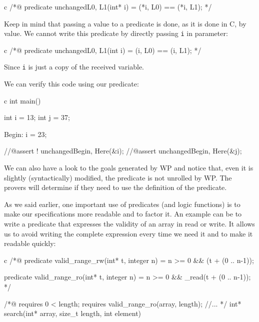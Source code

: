 \documentclass[middle]{zmdocument}
\begin{document}
\begin{CodeBlock}{c}
/*@
  predicate unchanged{L0, L1}(int* i) =
    \at(*i, L0) == \at(*i, L1);
*/
\end{CodeBlock}



\begin{Warning}
  Keep in mind that passing a value to a predicate is done, as it is done in C,
  by value. We cannot write this predicate by directly passing \texttt{i} in
  parameter:

\begin{CodeBlock}{c}
/*@
  predicate unchanged{L0, L1}(int i) =
    \at(i, L0) == \at(i, L1);
 */
\end{CodeBlock}

  Since \texttt{i} is just a copy of the received variable.
\end{Warning}


We can verify this code using our predicate:



\begin{CodeBlock}{c}
int main(){
  int i = 13;
  int j = 37;

 Begin:
  i = 23;
 
  //@assert ! unchanged{Begin, Here}(&i);
  //@assert   unchanged{Begin, Here}(&j);
}
\end{CodeBlock}



We can also have a look to the goals generated by WP and notice that,
even it is slightly (syntactically) modified, the predicate is not
unrolled by WP. The provers will determine if they need to use the
definition of the predicate.

As we said earlier, one important use of predicates (and logic
functions) is to make our specifications more readable and to factor it.
An example can be to write a predicate that expresses the validity of an
array in read or write. It allows us to avoid writing the complete
expression every time we need it and to make it readable quickly:



\begin{CodeBlock}{c}
/*@
  predicate valid_range_rw(int* t, integer n) =
    n >= 0 && \valid(t + (0 .. n-1));

  predicate valid_range_ro(int* t, integer n) =
    n >= 0 && \valid_read(t + (0 .. n-1));
*/

/*@
  requires 0 < length;
  requires valid_range_ro(array, length);
  //...
*/
int* search(int* array, size_t length, int element)
\end{CodeBlock}
\end{document}
